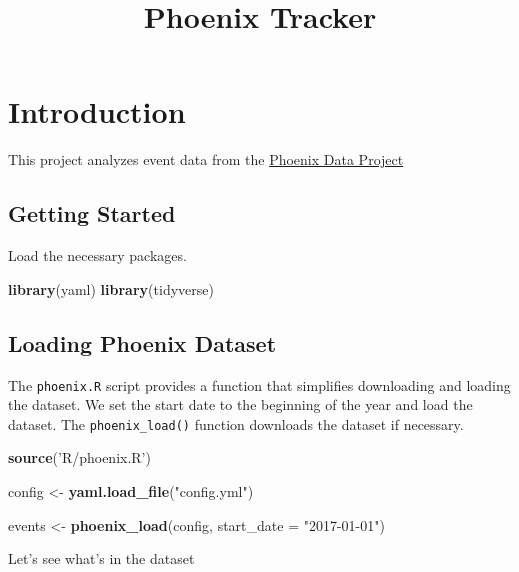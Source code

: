 \documentclass[]{article}
\title{Phoenix Tracker}
\author{}
\date{}
\newenvironment{Shaded}{\begin{snugshade}}{\end{snugshade}}
\newcommand{\KeywordTok}[1]{\textcolor[rgb]{0.13,0.29,0.53}{\textbf{{#1}}}}
\newcommand{\DataTypeTok}[1]{\textcolor[rgb]{0.13,0.29,0.53}{{#1}}}
\newcommand{\StringTok}[1]{\textcolor[rgb]{0.31,0.60,0.02}{{#1}}}
\newcommand{\NormalTok}[1]{{#1}}
\begin{document}
\maketitle

{
\setcounter{tocdepth}{2}
\tableofcontents
}
\section{Introduction}\label{introduction}

This project analyzes event data from the
\href{http://phoenixdata.org}{Phoenix Data Project}

\subsection{Getting Started}\label{getting-started}

Load the necessary packages.

\begin{Shaded}
\begin{Highlighting}[]
\KeywordTok{library}\NormalTok{(yaml)}
\KeywordTok{library}\NormalTok{(tidyverse)}
\end{Highlighting}
\end{Shaded}

\subsection{Loading Phoenix Dataset}\label{loading-phoenix-dataset}

The \texttt{phoenix.R} script provides a function that simplifies
downloading and loading the dataset. We set the start date to the
beginning of the year and load the dataset. The \texttt{phoenix\_load()}
function downloads the dataset if necessary.

\begin{Shaded}
\begin{Highlighting}[]
\KeywordTok{source}\NormalTok{(}\StringTok{'R/phoenix.R'}\NormalTok{)}

\NormalTok{config <-}\StringTok{ }\KeywordTok{yaml.load_file}\NormalTok{(}\StringTok{"config.yml"}\NormalTok{)}

\NormalTok{events <-}\StringTok{ }\KeywordTok{phoenix_load}\NormalTok{(config, }\DataTypeTok{start_date =} \StringTok{"2017-01-01"}\NormalTok{)}
\end{Highlighting}
\end{Shaded}

Let's see what's in the dataset
\end{document}
